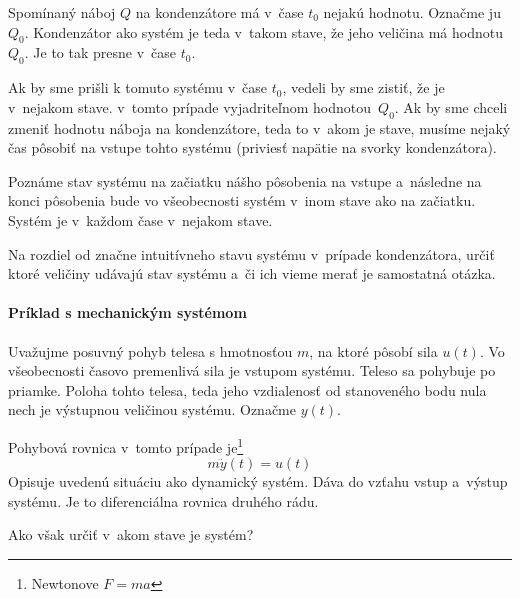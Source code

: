 \documentclass[a4paper, 10pt, ]{article}
\begin{document}
Spomínaný náboj $Q$ na kondenzátore má v~čase $t_0$ nejakú hodnotu. Označme ju~$Q_0$. Kondenzátor ako systém je teda v~takom stave, že jeho veličina má hodnotu~$Q_0$. Je to tak presne v~čase $t_0$. 

Ak by sme prišli k tomuto systému v~čase $t_0$, vedeli by sme zistiť, že je v~nejakom stave. v~tomto prípade vyjadriteľnom hodnotou~$Q_0$. Ak by sme chceli zmeniť hodnotu náboja na kondenzátore, teda to v~akom je stave, musíme nejaký čas pôsobiť na vstupe tohto systému (priviesť napätie na svorky kondenzátora).

Poznáme stav systému na začiatku nášho pôsobenia na vstupe a~následne na konci pôsobenia bude vo všeobecnosti systém v~inom stave ako na začiatku. Systém je v~každom čase v~nejakom stave.

Na rozdiel od značne intuitívneho stavu systému v~prípade kondenzátora, určiť ktoré veličiny udávajú stav systému a~či ich vieme merať je samostatná otázka.






\paragraph{Príklad s mechanickým systémom}


Uvažujme posuvný pohyb telesa s hmotnosťou $m$, na ktoré pôsobí sila $u(t)$. Vo všeobecnosti časovo premenlivá sila je vstupom systému. Teleso sa pohybuje po priamke. Poloha tohto telesa, teda jeho vzdialenosť od stanoveného bodu nula nech je výstupnou veličinou systému. Označme $y(t)$.

\begin{center}

    \vbox{%
        \makebox[\textwidth][c]{%
        
        }
    }
	\label{mechTeleso}

\end{center}

Pohybová rovnica v~tomto prípade je\footnote{Newtonove $F = ma$}
\begin{equation} \label{pohybr}
    m \ddot y(t) = u(t)
\end{equation}
Opisuje uvedenú situáciu ako dynamický systém. Dáva do vzťahu vstup a~výstup systému. Je to diferenciálna rovnica druhého rádu.

Ako však určiť v~akom stave je systém? 
\end{document}
